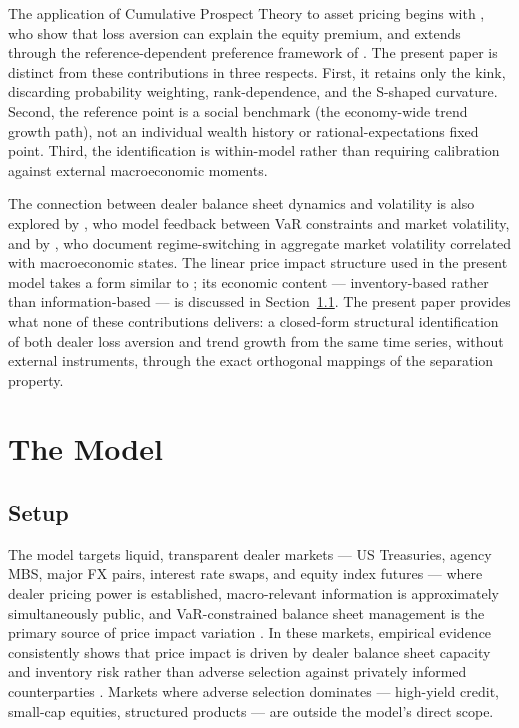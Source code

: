 \documentclass[12pt,a4paper]{article}
\theoremstyle{definition}
\begin{document}
The application of Cumulative Prospect Theory to asset pricing begins
with \citet{barberis2001}, who show that loss aversion can explain the
equity premium, and extends through the reference-dependent preference
framework of \citet{koszegi2006,koszegi2007}. The present paper is
distinct from these contributions in three respects. First, it retains
only the kink, discarding probability weighting, rank-dependence, and
the S-shaped curvature. Second, the reference point is a social
benchmark (the economy-wide trend growth path), not an individual wealth
history or rational-expectations fixed point. Third, the identification
is within-model rather than requiring calibration against external
macroeconomic moments.

The connection between dealer balance sheet dynamics and volatility
is also explored by \citet{danielsson2008}, who model feedback between
VaR constraints and market volatility, and by \citet{ang2005}, who
document regime-switching in aggregate market volatility correlated with
macroeconomic states. The linear price impact structure used in the
present model takes a form similar to \citet{kyle1985}; its economic
content --- inventory-based rather than information-based --- is discussed
in Section~\ref{sec:setup}. The present paper provides what none of
these contributions delivers: a closed-form structural identification
of both dealer loss aversion and trend growth from the same time series,
without external instruments, through the exact orthogonal mappings of
the separation property.



\section{The Model}
\label{sec:model}

\subsection{Setup}
\label{sec:setup}

The model targets liquid, transparent dealer markets --- US Treasuries,
agency MBS, major FX pairs, interest rate swaps, and equity index
futures --- where dealer pricing power is established, macro-relevant
information is approximately simultaneously public, and VaR-constrained
balance sheet management is the primary source of price impact variation
\citep{li2025,adrian2014}. In these markets, empirical evidence
consistently shows that price impact is driven by dealer balance sheet
capacity and inventory risk rather than adverse selection against
privately informed counterparties
\citep{fleming1999,brandt2004,li2025}. Markets where adverse selection
dominates --- high-yield credit, small-cap equities, structured products
--- are outside the model's direct scope.
\end{document}

